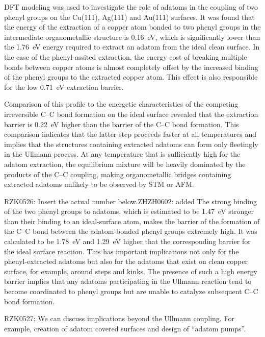 \documentclass[%
 reprint,
 amsmath,amssymb,
 aps,
prb,
floatfix,
]{revtex4-2}
\newcommand{\lock}{\color{red}}
\newcommand{\zhzh}{\color{blue}}
\newcommand{\lock}{\color{black}}
\newcommand{\zhzh}{\color{blue}}
\newcommand{\comm}{\color{ForestGreen}} %
\begin{document}
{\lock

DFT modeling was used to investigate the role of adatoms in the coupling of two phenyl groups on the Cu(111), Ag(111) and Au(111) surfaces. It was found that the energy of the extraction of a copper atom bonded to two phenyl groups in the intermediate organometallic structure is \SI{0.16}{\electronvolt}, which is significantly lower than the \SI{1.76}{\electronvolt} energy required to extract an adatom from the ideal clean surface. In the case of the phenyl-assited extraction, the energy cost of breaking multiple bonds between copper atoms is almost completely offset by the increased binding of the phenyl groups to the extracted copper atom. This effect is also responsible for the low \SI{0.71}{\electronvolt} extraction barrier. 

Comparison of this profile to the energetic characteristics of the competing irreversible C--C bond formation on the ideal surface revealed that the extraction barrier is \SI{0.22}{\electronvolt} higher than the barrier of the C--C bond formation. This comparison indicates that the latter step proceeds faster at all temperatures and implies that the structures containing extracted adatoms can form only fleetingly in the Ullmann process. At any temperature that is sufficiently high for the adatom extraction, the equilibrium mixture will be heavily dominated by the products of the C--C coupling, making organometallic bridges containing extracted adatoms unlikely to be observed by STM or AFM.


{\comm RZK0526: Insert the actual number below.}{\zhzh ZHZH0602: added}
The strong binding of the two phenyl groups to adatoms, which is estimated to be \SI{1.47}{\electronvolt} stronger than their binding to an ideal-surface atom, makes the barrier of the formation of the C--C bond between the adatom-bonded phenyl groups extremely high. It was calculated to be \SI{1.78}{\electronvolt} and \SI{1.29}{\electronvolt} higher that the corresponding barrier for the ideal surface reaction. This has important implications not only for the phenyl-extracted adatoms but also for the adatoms that exist on clean copper surface, for example, around steps and kinks. The presence of such a high energy barrier implies that any adatoms participating in the Ullmann reaction tend to become coordinated to phenyl groups but are unable to catalyze subsequent C--C bond formation.

{\comm RZK0527: We can discuss implications beyond the Ullmann coupling. For example, creation of adatom covered surfaces and design of ``adatom pumps''.}

}
\end{document}
